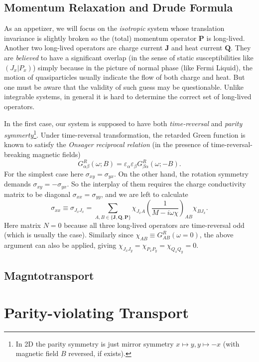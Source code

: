\documentclass[10pt,nofootinbib,letterpaper]{revtex4}
\begin{document}
	\subsection{Momentum Relaxation and Drude Formula}
		As an appetizer, we will focus on the \emph{isotropic} system whose translation invariance is slightly broken so the (total) momentum operator $\bm{P}$ is long-lived. Another two long-lived operators are charge current $\bm{J}$ and heat current $\bm{Q}$. They are \emph{believed} to have a significant overlap (in the sense of static susceptibilities like $(J_x|P_x)$) simply because in the picture of normal phase (like Fermi Liquid), the motion of quasiparticles usually indicate the flow of both charge and heat. But one must be aware that the validity of such guess may be questionable. Unlike integrable systems, in general it is hard to determine the correct set of long-lived operators.\par
		In the first case, our system is supposed to have both \emph{time-reversal} and \emph{parity symmerty}\footnote{In 2D the parity symmetry is just mirror symmetry $x\mapsto y,y\mapsto-x$ (with magnetic field $B$ reversed, if exists).}. Under time-reversal transformation, the retarded Green function is known to satisfy the \emph{Onsager reciprocal relation} \cite{onsager1931reciprocal} (in the presence of time-reversal-breaking magnetic fields)
		\begin{equation}\label{1.3.1}
			G^R_{\alpha \beta}(\omega;B)=\varepsilon_\alpha \varepsilon_\beta G^R_{\beta \alpha}(\omega;-B).
		\end{equation}
		For the simplest case here $\sigma_{xy}=\sigma_{yx}$. On the other hand, the rotation symmetry demands $\sigma_{xy}=-\sigma_{yx}$. So the interplay of them requires the charge conductivity matrix to be diagonal $\sigma_{xx}=\sigma_{yy}$, and we are left to calculate
		\begin{equation}\label{1.3.2}
			\sigma_{xx}\equiv\sigma_{J_x J_x}=\sum_{A,B\in\{\bm{J},\bm{Q},\bm{P}\}}\chi_{J_x A} \left(\dfrac{1}{M-i\omega\chi}\right)_{AB}\chi_{BJ_x}. 
		\end{equation}
		Here matrix $N=0$ because all three long-lived operators are time-reversal odd (which is usually the case). Similarly since $\chi_{AB}\equiv G^R_{AB}(\omega=0)$, the above argument can also be applied, giving $\chi_{J_xJ_y}=\chi_{P_xP_y}=\chi_{Q_xQ_y}=0$.

	\subsection{Magntotransport}
		

\section{Parity-violating Transport}




\end{document}
